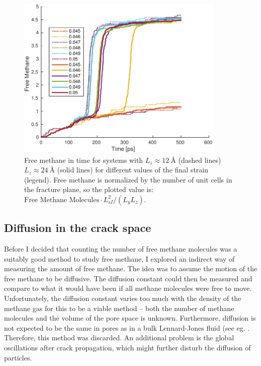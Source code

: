 \begin{figure}
\centering
\includegraphics[width=10cm]{../figures/thesis/free_methane_nz1_nz2.pdf}
\caption{Free methane in time for systems with $L_z \approx \SI{12}{\angstrom}$ (dashed lines) $L_z\approx \SI{24}{\angstrom}$ (solid lines) for different values of the final strain (legend). Free methane is normalized by the number of unit cells in the fracture plane, so the plotted value is: $\text{Free Methane Molecules}\cdot L_{sI}^2/(L_yL_z)$.}
\label{fig:free_methane_diff_l}
\end{figure}

\subsection{Diffusion in the crack space}
Before I decided that counting the number of free methane molecules was a suitably good method to study free methane, I explored an indirect way of measuring the amount of free methane. The idea was to assume the motion of the free methane to be diffusive. The diffusion constant could then be measured and compare to what it would have been if all methane molecules were free to move. Unfortunately, the diffusion constant varies too much with the density of the methane gas for this to be a viable method -- both the number of methane molecules and the volume of the pore space is unknown. Furthermore, diffusion is not expected to be the same in pores as in a bulk Lennard-Jones fluid (see eg. \citet[p. 18]{Pozhar:1668293}. Therefore, this method was discarded. An additional problem is the global oscillations after crack propagation, which might further disturb the diffusion of particles. 

